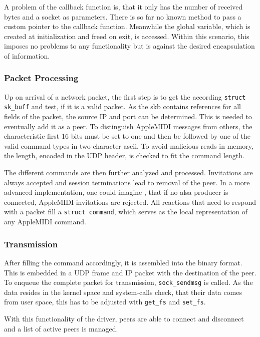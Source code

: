 \documentclass[paper=a4,fontsize=11pt,twocolumn,pagesize,bibtotoc]{scrartcl}
\begin{document}
	A problem of the callback function is, that it only has the number of received bytes and a socket as parameters. There is so far no known method to pass a custom pointer to the callback function. Meanwhile the global variable, which is created at initialization and freed on exit, is accessed. Within this scenario, this imposes no problems to any functionality but is against the desired encapsulation of information.
	
	\subsubsection{Packet Processing}
	
	Up on arrival of a network packet, the first step is to get the according \texttt{struct sk\_buff} and test, if it is a valid packet. As the skb contains references for all fields of the packet, the source IP and port can be determined. This is needed to eventually add it as a peer. To distinguish AppleMIDI messages from others, the characteristic first 16 bits must be set to one and then be followed by one of the valid command types in two character ascii. To avoid malicious reads in memory, the length, encoded in the UDP header, is checked to fit the command length.
	
	The different commands are then further analyzed and processed. Invitations are always accepted and session terminations lead to removal of the peer. In a more advanced implementation, one could imagine , that if no alsa producer is connected, AppleMIDI invitations are rejected. All reactions that need to respond with a packet fill a \texttt{struct command}, which serves as the local representation of any AppleMIDI command.
	
	\subsubsection{Transmission} 
	
	After filling the command accordingly, it is assembled into the binary format. This is embedded in a UDP frame and IP packet with the destination of the peer. To enqueue the complete packet for transmission, \texttt{sock\_sendmsg} is called. As the data resides in the kernel space and system-calls check, that their data comes from user space, this has to be adjusted with \texttt{get\_fs} and \texttt{set\_fs}. 
	
	With this functionality of the driver, peers are able to connect and disconnect and a list of active peers is managed.
	
\end{document}
